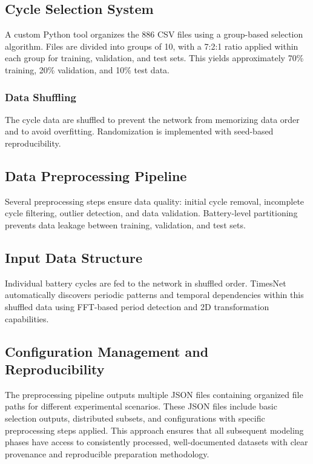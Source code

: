 \subsection{Cycle Selection System}
\label{subsec:cycle_selection_system}

A custom Python tool organizes the 886 CSV files using a group-based selection algorithm. Files are divided into groups of 10, with a 7:2:1 ratio applied within each group for training, validation, and test sets. This yields approximately 70\% training, 20\% validation, and 10\% test data.

\subsubsection{Data Shuffling}

The cycle data are shuffled to prevent the network from memorizing data order and to avoid overfitting. Randomization is implemented with seed-based reproducibility.

\subsection{Data Preprocessing Pipeline}
\label{subsec:preprocessing_pipeline}

Several preprocessing steps ensure data quality: initial cycle removal, incomplete cycle filtering, outlier detection, and data validation. Battery-level partitioning prevents data leakage between training, validation, and test sets.

\subsection{Input Data Structure}
\label{subsec:input_data_structure}

Individual battery cycles are fed to the network in shuffled order. TimesNet automatically discovers periodic patterns and temporal dependencies within this shuffled data using FFT-based period detection and 2D transformation capabilities.

\subsection{Configuration Management and Reproducibility}
\label{subsec:config_management}

The preprocessing pipeline outputs multiple JSON files containing organized file paths for different experimental scenarios. These JSON files include basic selection outputs, distributed subsets, and configurations with specific preprocessing steps applied. This approach ensures that all subsequent modeling phases have access to consistently processed, well-documented datasets with clear provenance and reproducible preparation methodology.

